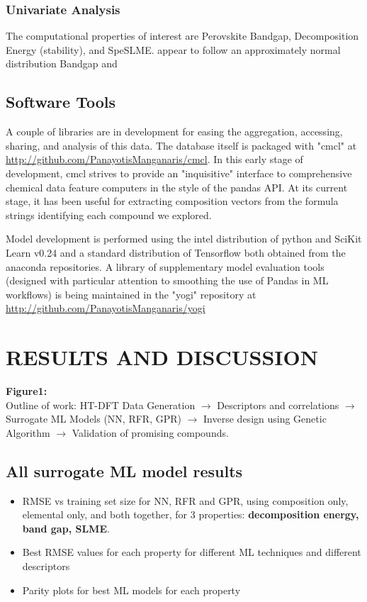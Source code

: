 \documentclass[aip, jmp, amsmath, amssymb, reprint]{revtex4-2}
\begin{document}
\subsubsection*{Univariate Analysis}
\label{sec:org63d61d2}
The computational properties of interest are Perovskite Bandgap,
Decomposition Energy (stability), and SpeSLME. appear to follow an
approximately normal distribution Bandgap and

\subsection*{Software Tools}
\label{sec:orgcb95a87}
A couple of libraries are in development for easing the aggregation,
accessing, sharing, and analysis of this data.  The database itself is
packaged with "cmcl" at \url{http://github.com/PanayotisManganaris/cmcl}.
In this early stage of development, cmcl strives to provide an
"inquisitive" interface to comprehensive chemical data feature
computers in the style of the pandas API. At its current stage, it has
been useful for extracting composition vectors from the formula
strings identifying each compound we explored.

Model development is performed using the intel distribution of python
and SciKit Learn v0.24 and a standard distribution of Tensorflow both
obtained from the anaconda repositories. A library of supplementary
model evaluation tools (designed with particular attention to
smoothing the use of Pandas in ML workflows) is being maintained in
the "yogi" repository at \url{http://github.com/PanayotisManganaris/yogi}

\section*{RESULTS AND DISCUSSION}
\label{sec:orgadd1d0b}
\textbf{Figure1:}\\
Outline of work: HT-DFT Data Generation \(\rightarrow\) Descriptors and
correlations \(\rightarrow\) Surrogate ML Models (NN, RFR, GPR)
\(\rightarrow\) Inverse design using Genetic Algorithm \(\rightarrow\)
Validation of promising compounds.\\


\subsection*{All surrogate ML model results}
\label{sec:orgaa22daa}

\begin{itemize}
\item RMSE vs training set size for NN, RFR and GPR, using composition only,
elemental only, and both together, for 3 properties: \textbf{decomposition
energy, band gap, SLME}.

\item Best RMSE values for each property for different ML techniques and
different descriptors

\item Parity plots for best ML models for each property
\end{itemize}
\end{document}
